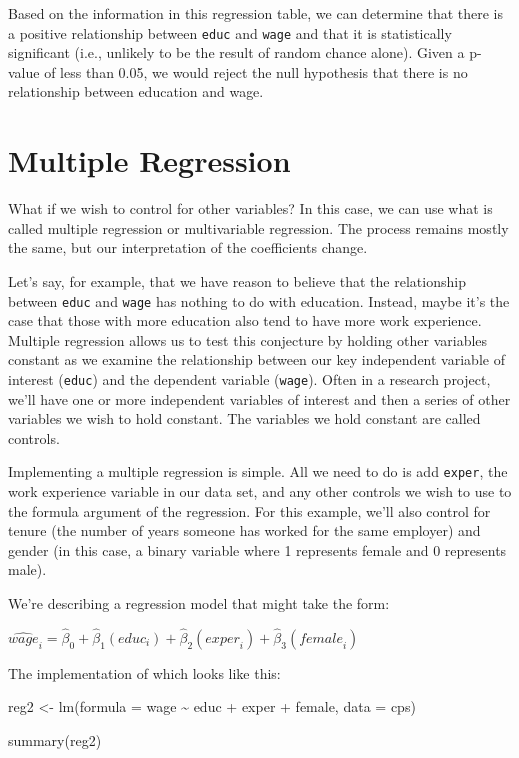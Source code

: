 \documentclass[
  letterpaper,
]{book}
\newenvironment{Shaded}{\begin{snugshade}}{\end{snugshade}}
\newcommand{\AttributeTok}[1]{\textcolor[rgb]{0.40,0.45,0.13}{#1}}
\newcommand{\FunctionTok}[1]{\textcolor[rgb]{0.28,0.35,0.67}{#1}}
\newcommand{\NormalTok}[1]{\textcolor[rgb]{0.00,0.23,0.31}{#1}}
\newcommand{\OtherTok}[1]{\textcolor[rgb]{0.00,0.23,0.31}{#1}}
\newcommand{\SpecialCharTok}[1]{\textcolor[rgb]{0.37,0.37,0.37}{#1}}
\begin{document}
Based on the information in this regression table, we can determine that
there is a positive relationship between \texttt{educ} and \texttt{wage}
and that it is statistically significant (i.e., unlikely to be the
result of random chance alone). Given a p-value of less than 0.05, we
would reject the null hypothesis that there is no relationship between
education and wage.

\hypertarget{multiple-regression}{%
\section{Multiple Regression}\label{multiple-regression}}

What if we wish to control for other variables? In this case, we can use
what is called multiple regression or multivariable regression. The
process remains mostly the same, but our interpretation of the
coefficients change.

Let's say, for example, that we have reason to believe that the
relationship between \texttt{educ} and \texttt{wage} has nothing to do
with education. Instead, maybe it's the case that those with more
education also tend to have more work experience. Multiple regression
allows us to test this conjecture by holding other variables constant as
we examine the relationship between our key independent variable of
interest (\texttt{educ}) and the dependent variable (\texttt{wage}).
Often in a research project, we'll have one or more independent
variables of interest and then a series of other variables we wish to
hold constant. The variables we hold constant are called controls.

Implementing a multiple regression is simple. All we need to do is add
\texttt{exper}, the work experience variable in our data set, and any
other controls we wish to use to the formula argument of the regression.
For this example, we'll also control for tenure (the number of years
someone has worked for the same employer) and gender (in this case, a
binary variable where 1 represents female and 0 represents male).

We're describing a regression model that might take the form:

\(\widehat{\textit{wage}}_{i} = \hat{\beta}_{0} + \hat{\beta}_{1}({\textit{educ}}_{i}) + \hat{\beta}_{2}(\textit{exper}_{i}) + \hat{\beta}_{3}(\textit{female}_{i})\)

The implementation of which looks like this:

\begin{Shaded}
\begin{Highlighting}[]
\NormalTok{reg2 }\OtherTok{\textless{}{-}} \FunctionTok{lm}\NormalTok{(}\AttributeTok{formula =}\NormalTok{ wage }\SpecialCharTok{\textasciitilde{}}\NormalTok{ educ }\SpecialCharTok{+}\NormalTok{ exper }\SpecialCharTok{+}\NormalTok{ female, }\AttributeTok{data =}\NormalTok{ cps)}

\FunctionTok{summary}\NormalTok{(reg2)}
\end{Highlighting}
\end{Shaded}
\end{document}
